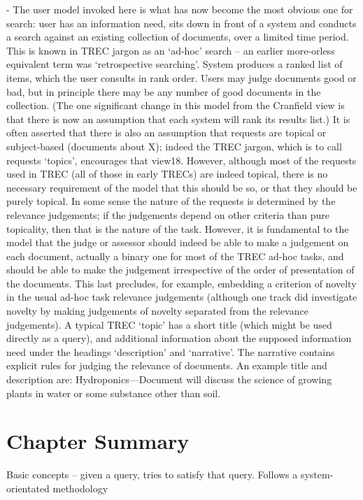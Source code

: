 - The user model invoked here is what has now become the most obvious one for search: user has an
information need, sits down in front of a system and conducts a search against an existing collection of
documents, over a limited time period. This is known in TREC jargon as an ‘ad-hoc’ search – an earlier more-orless
equivalent term was ‘retrospective searching’. System produces a ranked list of items, which the user consults
in rank order. Users may judge documents good or bad, but in principle there may be any number of good
documents in the collection. (The one significant change in this model from the Cranfield view is that there is now
an assumption that each system will rank its results list.) It is often asserted that there is also an assumption that
requests are topical or subject-based (documents about X); indeed the TREC jargon, which is to call requests
‘topics’, encourages that view18. However, although most of the requests used in TREC (all of those in early
TRECs) are indeed topical, there is no necessary requirement of the model that this should be so, or that they
should be purely topical. In some sense the nature of the requests is determined by the relevance judgements; if
the judgements depend on other criteria than pure topicality, then that is the nature of the task.
However, it is fundamental to the model that the judge or assessor should indeed be able to make a judgement
on each document, actually a binary one for most of the TREC ad-hoc tasks, and should be able to make the
judgement irrespective of the order of presentation of the documents. This last precludes, for example, embedding
a criterion of novelty in the usual ad-hoc task relevance judgements (although one track did investigate novelty by
making judgements of novelty separated from the relevance judgements). A typical TREC ‘topic’ has a short title (which might be used directly as a query), and additional information about the
supposed information need under the headings ‘description’ and ‘narrative’. The narrative contains explicit rules for
judging the relevance of documents. An example title and description are: Hydroponics—Document will discuss the
science of growing plants in water or some substance other than soil. 


\section{Chapter Summary}



Basic concepts -- given a query, tries to satisfy that query.
Follows a system-orientated methodology

